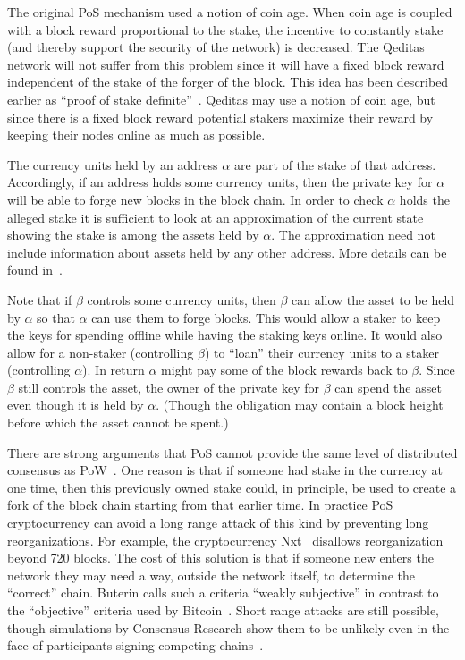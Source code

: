 \documentclass{article}
\begin{document}
The original PoS mechanism used a notion of coin age.
When coin age is coupled with a block reward proportional to the stake,
the incentive to constantly stake (and thereby support the security of the network) is decreased.
The Qeditas network will not suffer from this problem since it will have a fixed
block reward independent of the stake of the forger of the block. This idea has
been described earlier as ``proof of stake definite''~\cite{ProofOfStakeDefinite}. Qeditas may use a notion
of coin age, but since there is a fixed block reward potential stakers maximize
their reward by keeping their nodes online as much as possible.

The currency units held by an address $\alpha$ are part of the stake of that address.
Accordingly, if an address holds some currency units, then
the private key for $\alpha$
will be able to forge new blocks in the block chain.
In order to check $\alpha$ holds the alleged stake it is sufficient
to look at an approximation of the current state showing the
stake is among the assets held by $\alpha$. The approximation
need not include information about assets held by any other address.
More details can be found in~\cite{White2015b}.

Note that if $\beta$ controls some currency units, then $\beta$ can allow the asset to be
held by $\alpha$ so that $\alpha$ can use them to forge blocks. 
This would allow a staker to keep the keys for spending offline while having the staking keys online.
It would also allow for a non-staker (controlling $\beta$) to ``loan'' their currency units to a staker (controlling $\alpha$).
In return $\alpha$
might pay some of the block rewards back to $\beta$.
Since $\beta$ still controls the asset, the owner of the private key for $\beta$
can spend the asset even though it is held by $\alpha$.
(Though the obligation may contain a block height before which the asset cannot be spent.)

There are strong arguments that PoS cannot provide the same level
of distributed consensus as PoW~\cite{Poelstra2014}.
One reason is that if someone had stake in the currency at one time,
then this previously owned stake could, in principle, be used to create
a fork of the block chain starting from that earlier time.
In practice PoS cryptocurrency can avoid a long range attack
of this kind by preventing long reorganizations.
For example, the cryptocurrency Nxt~\cite{Nxt} disallows reorganization beyond
720 blocks. The cost of this solution is that if someone new enters the network
they may need a way, outside the network itself, to determine the ``correct'' chain.
Buterin calls such a criteria ``weakly subjective''
in contrast to the ``objective'' criteria used by
Bitcoin~\cite{Buterin2014}.
Short range attacks are still possible, though simulations
by Consensus Research show them to be unlikely
even in the face of participants signing competing chains~\cite{Chepurnoy2014d,multistrategy,ConsensusResearch}.
\end{document}

